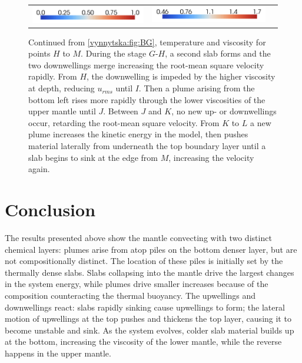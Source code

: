 \begin{figure}[htbp]
\begin{center}
\begin{tabular}{c c l}
\includegraphics[width=0.45\columnwidth]{chapters/vynnytska/figures/tmleg.png} &
\includegraphics[width=0.45\columnwidth]{chapters/vynnytska/figures/visleg.png} &
\end{tabular}
\end{center}
\label{vynnytska:fig:HM}
\caption{Continued from \ref{vynnytska:fig:BG}, temperature and
  viscosity for points $H$ to $M$. During the stage $G$-$H$, a second
  slab forms and the two downwellings merge increasing the root-mean
  square velocity rapidly. From $H$, the downwelling is impeded by the
  higher viscosity at depth, reducing $u_{rms}$ until $I$. Then a
  plume arising from the bottom left rises more rapidly through the
  lower viscosities of the upper mantle until $J$. Between $J$ and
  $K$, no new up- or downwellings occur, retarding the root-mean
  square velocity. From $K$ to $L$ a new plume increases the kinetic
  energy in the model, then pushes material laterally from underneath
  the top boundary layer until a slab begins to sink at the edge from
  $M$, increasing the velocity again.}
\end{figure}


\section{Conclusion}

The results presented above show the mantle convecting with two
distinct chemical layers: plumes arise from atop piles on the bottom
denser layer, but are not compositionally distinct. The location of
these piles is initially set by the thermally dense slabs. Slabs
collapsing into the mantle drive the largest changes in the system
energy, while plumes drive smaller increases because of the
composition counteracting the thermal buoyancy. The upwellings and
downwellings react: slabs rapidly sinking cause upwellings to form;
the lateral motion of upwellings at the top pushes and thickens the
top layer, causing it to become unstable and sink. As the system
evolves, colder slab material builds up at the bottom, increasing the
viscosity of the lower mantle, while the reverse happens in the upper
mantle.

